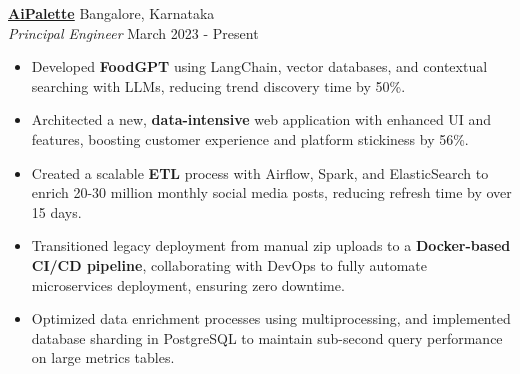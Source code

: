 \textbf{\href{https://www.aipalette.com}{AiPalette}} \hfill Bangalore, Karnataka\\
\textit{Principal Engineer} \hfill March 2023 - Present
\begin{itemize}[leftmargin=*]
  \itemsep0em
  \item Developed \textbf{FoodGPT} using LangChain, vector databases, and contextual searching with LLMs, reducing trend discovery time by 50\%.
  \item Architected a new, \textbf{data-intensive} web application with enhanced UI and features, boosting customer experience and platform stickiness by 56\%.
  \item Created a scalable \textbf{ETL} process with Airflow, Spark, and ElasticSearch to enrich 20-30 million monthly social media posts, reducing refresh time by over 15 days.
  \item Transitioned legacy deployment from manual zip uploads to a \textbf{Docker-based CI/CD pipeline}, collaborating with DevOps to fully automate microservices deployment, ensuring zero downtime.
  \item Optimized data enrichment processes using multiprocessing, and implemented database sharding in PostgreSQL to maintain sub-second query performance on large metrics tables.
\end{itemize}
